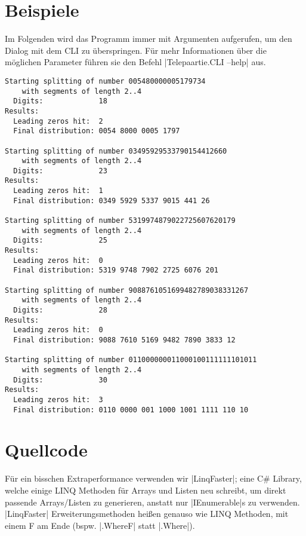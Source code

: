 \documentclass[a4paper,10pt,ngerman]{scrartcl}
\begin{document}
\section{Beispiele}
Im Folgenden wird das Programm immer mit Argumenten aufgerufen, um den Dialog mit dem CLI zu überspringen. Für mehr Informationen über die möglichen Parameter führen sie den Befehl |Telepaartie.CLI --help| aus.
\begin{lstlisting}
Starting splitting of number 005480000005179734
    with segments of length 2..4
  Digits:             18
Results:
  Leading zeros hit:  2
  Final distribution: 0054 8000 0005 1797

Starting splitting of number 03495929533790154412660
    with segments of length 2..4
  Digits:             23
Results:
  Leading zeros hit:  1
  Final distribution: 0349 5929 5337 9015 441 26

Starting splitting of number 5319974879022725607620179
    with segments of length 2..4
  Digits:             25
Results:
  Leading zeros hit:  0
  Final distribution: 5319 9748 7902 2725 6076 201

Starting splitting of number 9088761051699482789038331267
    with segments of length 2..4
  Digits:             28
Results:
  Leading zeros hit:  0
  Final distribution: 9088 7610 5169 9482 7890 3833 12

Starting splitting of number 011000000011000100111111101011
    with segments of length 2..4
  Digits:             30
Results:
  Leading zeros hit:  3
  Final distribution: 0110 0000 001 1000 1001 1111 110 10
\end{lstlisting}

\section{Quellcode}

Für ein bisschen Extraperformance verwenden wir |LinqFaster|; eine C\# Library, welche einige LINQ Methoden für Arrays und Listen neu schreibt, um direkt passende Arrays/Listen zu generieren, anstatt nur |IEnumerable|s zu verwenden.
|LinqFaster| Erweiterungsmethoden heißen genauso wie LINQ Methoden, mit einem F am Ende (bspw. |.WhereF| statt |.Where|).
\end{document}

